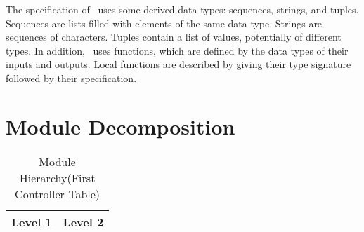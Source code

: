 \documentclass[12pt, titlepage]{article}
\begin{document}
\noindent
The specification of \progname \ uses some derived data types: sequences, strings, and
tuples. Sequences are lists filled with elements of the same data type. Strings
are sequences of characters. Tuples contain a list of values, potentially of
different types. In addition, \progname \ uses functions, which
are defined by the data types of their inputs and outputs. Local functions are
described by giving their type signature followed by their specification.

\newpage

\section{Module Decomposition}


\begin{table}[H]
\caption{Module Hierarchy(First Controller Table)}
\label{TblControllers}

\centering
\begin{tabular}{p{} p{}}
\toprule
\textbf{Level 1} & \textbf{Level 2}\\
\midrule


\end{tabular}
\end{table}
\end{document}
